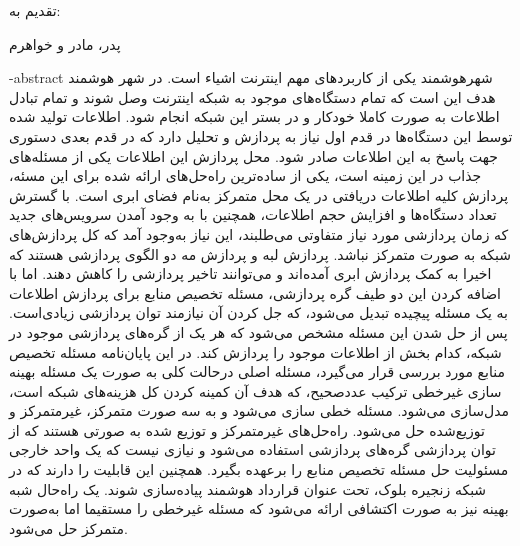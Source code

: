 \cleartorightpage
\esalatPage

\cleartorightpage
\thispagestyle{empty}
{\Large تقدیم به:} \\
\begin{flushleft}
  {
    \huge
    پدر، مادر و خواهرم
  }
\end{flushleft}

\cleartorightpage
{}

\fa-abstract{
	شهرهوشمند یکی از کاربردهای مهم اینترنت اشیاء است. در شهر هوشمند هدف این است که تمام دستگاه‌های موجود به شبکه اینترنت وصل شوند و تمام تبادل اطلاعات به صورت کاملا خودکار و در بستر این شبکه انجام شود. اطلاعات تولید شده توسط این دستگاه‌ها در قدم اول نیاز به پردازش و تحلیل دارد که در قدم بعدی دستوری جهت پاسخ به این اطلاعات صادر شود. محل پردازش این اطلاعات یکی از مسئله‌های جذاب در این زمینه است، یکی از ساده‌ترین راه‌حل‌های ارائه شده برای این مسئه، پردازش کلیه‌ اطلاعات دریافتی در یک محل متمرکز به‌نام فضای ابری است. با گسترش تعداد دستگاه‌ها و افزایش حجم اطلاعات، همچنین با به وجود آمدن سرویس‌های جدید که زمان پردازشی مورد نیاز متفاوتی می‌طلبند، این نیاز به‌وجود آمد که کل پردازش‌های شبکه به صورت متمرکز نباشد. پردازش لبه و پردازش مه دو الگوی پردازشی هستند که اخیرا به کمک پردازش ابری آمده‌اند و می‌توانند تاخیر پردازشی را کاهش دهند. اما با اضافه کردن این دو طیف گره پردازشی، مسئله تخصیص منابع برای پردازش اطلاعات به یک مسئله پیچیده تبدیل می‌شود، که جل کردن آن نیازمند توان پردازشی زیادی‌است. پس از حل شدن این مسئله مشخص می‌شود که هر یک از گره‌های پردازشی موجود در شبکه، کدام بخش از اطلاعات موجود را پردازش کند. 
	در این پایان‌نامه مسئله تخصیص منابع مورد بررسی قرار می‌گیرد، مسئله اصلی درحالت کلی به صورت یک مسئله بهینه سازی غیرخطی ترکیب عددصحیح، که هدف آن کمینه کردن کل هزینه‌های شبکه است، مدل‌سازی می‌شود.  	مسئله خطی سازی می‌شود و به سه صورت متمرکز، غیرمتمرکز و توزیع‌شده حل می‌شود. راه‌حل‌های غیرمتمرکز و توزیع شده به صورتی هستند که از توان پردازشی گره‌های پردازشی استفاده می‌شود و نیازی نیست که یک واحد خارجی مسئولیت حل مسئله تخصیص منابع را برعهده بگیرد. همچنین این قابلیت را دارند که در شبکه زنجیره‌ بلوک، تحت عنوان قرارداد هوشمند پیاده‌سازی شوند.
	یک راه‌حال شبه بهینه نیز به صورت اکتشافی ارائه می‌شود که مسئله غیرخطی را مستقیما اما به‌صورت متمرکز حل می‌شود. 
}

\cleartorightpage
\abstractPage

\cleartorightpage
